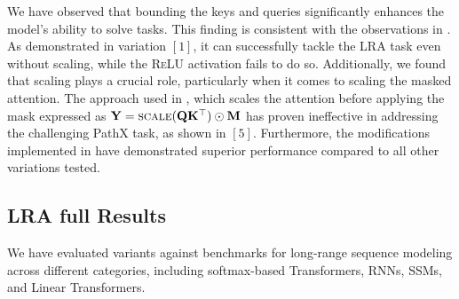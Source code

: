 We have observed that bounding the keys and queries significantly enhances the model's ability to solve tasks. This finding is consistent with the observations in \cite{deltanet}. As demonstrated in variation \([1]\), it can successfully tackle the LRA task even without scaling, while the \textsc{ReLU} activation fails to do so. Additionally, we found that scaling plays a crucial role, particularly when it comes to scaling the masked attention. The approach used in \lion, which scales the attention before applying the mask expressed as \(\mathbf{Y} = \textsc{scale}(\mathbf{Q}\mathbf{K}^{\top}) \odot \mathbf{M}\) has proven ineffective in addressing the challenging PathX task, as shown in \([5]\). Furthermore, the modifications implemented in \lions have demonstrated superior performance compared to all other variations tested.


\subsection{LRA full Results}

We have evaluated \lion variants against benchmarks for long-range sequence modeling across different categories, including softmax-based Transformers, RNNs, SSMs, and Linear Transformers.

